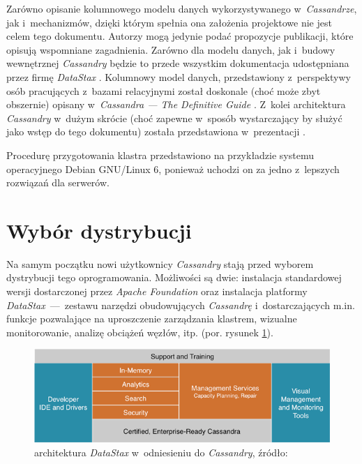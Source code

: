 \documentclass{article} %
\begin{document}
Zarówno opisanie kolumnowego modelu danych wykorzystywanego w~\emph{Cassandrze}, jak i~mechanizmów, dzięki którym spełnia ona założenia projektowe nie jest celem tego dokumentu.
Autorzy mogą jedynie podać propozycje publikacji, które opisują wspomniane zagadnienia.
Zarówno dla modelu danych, jak i~budowy wewnętrznej \emph{Cassandry} będzie to przede wszystkim dokumentacja udostępniana przez firmę \emph{DataStax} \cite{datastax}.
Kolumnowy model danych, przedstawiony z~perspektywy osób pracujących z~bazami relacyjnymi został doskonale (choć może zbyt obszernie) opisany w~\emph{Cassandra --- The Definitive Guide} \cite{definitiveguide}.
Z~kolei architektura \emph{Cassandry} w~dużym skrócie (choć zapewne w~sposób wystarczający by służyć jako wstęp do tego dokumentu) została przedstawiona w~prezentacji \cite{prezentacja_srds}.

Procedurę przygotowania klastra przedstawiono na przykładzie systemu operacyjnego Debian GNU/Linux 6, ponieważ uchodzi on za jedno z~lepszych rozwiązań dla serwerów.

\section{Wybór dystrybucji}\label{sec:distro}

Na samym początku nowi użytkownicy \emph{Cassandry} stają przed wyborem dystrybucji tego oprogramowania.
Możliwości są dwie: instalacja standardowej wersji dostarczonej przez \emph{Apache Foundation} oraz instalacja platformy \emph{DataStax}~---~zestawu narzędzi obudowujących \emph{Cassandrę} i~dostarczających m.in. funkcje pozwalające na uproszczenie zarządzania klastrem, wizualne monitorowanie, analizę obciążeń węzłów, itp. (por. rysunek \ref{fig:datastax_arch}).

\begin{figure}[h]
\centering
\includegraphics[width=\linewidth]{gfx/datastax}
\caption{architektura \emph{DataStax} w~odniesieniu do \emph{Cassandry}, źródło:~\cite{whydatastax}}
\label{fig:datastax_arch}
\end{figure}
\end{document}
